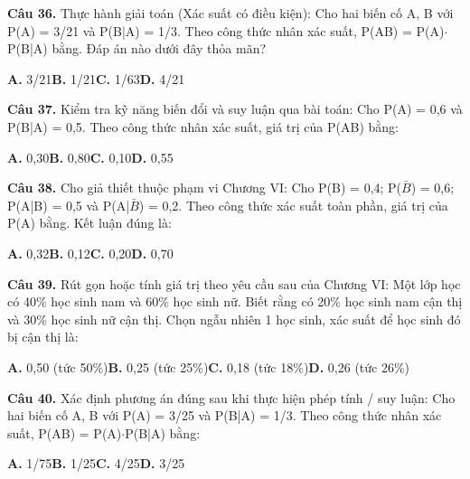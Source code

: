 \documentclass[11pt,a4paper]{article}
\begin{document}
\textbf{\color{primary} Câu 36.} Thực hành giải toán (Xác suất có điều kiện): Cho hai biến cố A, B với P(A) = 3/21 và P(B|A) = 1/3. Theo công thức nhân xác suất, P(AB) = P(A)$\cdot$P(B|A) bằng. Đáp án nào dưới đây thỏa mãn?\par
\hspace*{1.5em}\textbf{A.} 3/21\quad\quad \textbf{B.} 1/21\quad\quad \textbf{C.} 1/63\quad\quad \textbf{D.} 4/21\par\vspace{2pt}
\textbf{\color{primary} Câu 37.} Kiểm tra kỹ năng biến đổi và suy luận qua bài toán: Cho P(A) = 0,6 và P(B|A) = 0,5. Theo công thức nhân xác suất, giá trị của P(AB) bằng:\par
\hspace*{1.5em}\textbf{A.} 0,30\quad\quad \textbf{B.} 0,80\quad\quad \textbf{C.} 0,10\quad\quad \textbf{D.} 0,55\par\vspace{2pt}
\textbf{\color{primary} Câu 38.} Cho giả thiết thuộc phạm vi Chương VI: Cho P(B) = 0,4; P($\bar{B}$) = 0,6; P(A|B) = 0,5 và P(A|$\bar{B}$) = 0,2. Theo công thức xác suất toàn phần, giá trị của P(A) bằng. Kết luận đúng là:\par
\hspace*{1.5em}\textbf{A.} 0,32\quad\quad \textbf{B.} 0,12\quad\quad \textbf{C.} 0,20\quad\quad \textbf{D.} 0,70\par\vspace{2pt}
\textbf{\color{primary} Câu 39.} Rút gọn hoặc tính giá trị theo yêu cầu sau của Chương VI: Một lớp học có 40\% học sinh nam và 60\% học sinh nữ. Biết rằng có 20\% học sinh nam cận thị và 30\% học sinh nữ cận thị. Chọn ngẫu nhiên 1 học sinh, xác suất để học sinh đó bị cận thị là:\par
\hspace*{1.5em}\textbf{A.} 0,50 (tức 50\%)\quad\quad \textbf{B.} 0,25 (tức 25\%)\quad\quad \textbf{C.} 0,18 (tức 18\%)\quad\quad \textbf{D.} 0,26 (tức 26\%)\par\vspace{2pt}
\textbf{\color{primary} Câu 40.} Xác định phương án đúng sau khi thực hiện phép tính / suy luận: Cho hai biến cố A, B với P(A) = 3/25 và P(B|A) = 1/3. Theo công thức nhân xác suất, P(AB) = P(A)$\cdot$P(B|A) bằng:\par
\hspace*{1.5em}\textbf{A.} 1/75\quad\quad \textbf{B.} 1/25\quad\quad \textbf{C.} 4/25\quad\quad \textbf{D.} 3/25\par\vspace{2pt}
\end{document}
